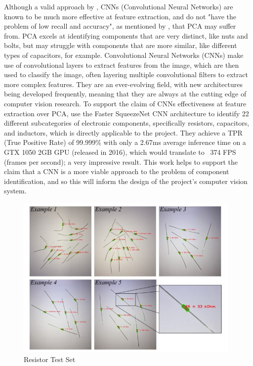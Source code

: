 Although a valid approach by \citet{Dhenge2013MechanicalNS}, CNNs (Convolutional Neural Networks) are known to be much more effective at feature extraction, and do not "have the problem of low recall and accuracy", as mentioned by \citet{Xu2020}, that PCA may suffer from. PCA excels at identifying components that are very distinct, like nuts and bolts, but may struggle with components that are more similar, like different types of capacitors, for example. Convolutional Neural Networks (CNNs) make use of convolutional layers to extract features from the image, which are then used to classify the image, often layering multiple convolutional filters to extract more complex features. They are an ever-evolving field, with new architectures being developed frequently, meaning that they are always at the cutting edge of computer vision research. To support the claim of CNNs effectiveness at feature extraction over PCA, \citet{Xu2020} use the Faster SqueezeNet CNN architecture to identify 22 different subcategories of electronic components, specifically resistors, capacitors, and inductors, which is directly applicable to the project. They achieve a TPR (True Positive Rate) of 99.999\% with only a 2.67ms average inference time on a GTX 1050 2GB GPU (released in 2016), which would translate to ~374 FPS (frames per second); a very impressive result. This work helps to support the claim that a CNN is a more viable approach to the problem of component identification, and so this will inform the design of the project's computer vision system.

\begin{figure}[H]
  \hfill
  \begin{minipage}[t]{\textwidth}
    \centering
    \includegraphics[height=8cm]{imgs/articles/resistordata.jpg}
    \caption{Resistor Test Set \citet{8939034}}
    \label{fig:resistordata}
  \end{minipage}
\end{figure}

